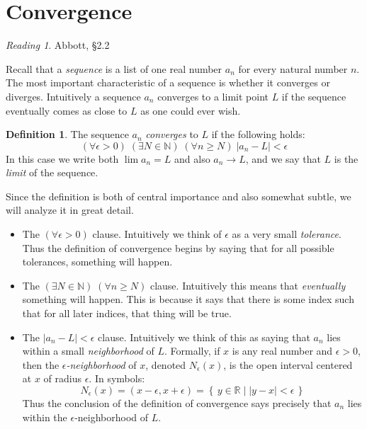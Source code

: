 \documentclass[11pt,oneside]{amsbook}
\newcommand{\set}[1]{\left\{\,#1\,\right\}}
\newcommand{\N}{\mathbb N}
\newcommand{\R}{\mathbb R}
\theoremstyle{definition}
\theoremstyle{plain}
\theoremstyle{definition}
\newtheorem{definition}[theorem]{Definition}
\theoremstyle{remark}
\newtheorem*{reading}{Reading}
\numberwithin{equation}{section}
\numberwithin{figure}{section}
\begin{document}
\newpage
\section{Convergence}

\begin{reading}
  Abbott, \S 2.2
\end{reading}

Recall that a \emph{sequence} is a list of one real number $a_n$ for every natural number $n$. The most important characteristic of a sequence is whether it converges or diverges. Intuitively a sequence $a_n$ converges to a limit point $L$ if the sequence eventually comes as close to $L$ as one could ever wish.

\begin{definition}
  The sequence $a_n$ \emph{converges} to $L$ if the following holds:
  \[(\forall\epsilon>0)\;(\exists N\in\N)\;(\forall n\geq N)\;|a_n-L|<\epsilon
  \]
  In this case we write both $\lim a_n=L$ and also $a_n\to L$, and we say that $L$ is the \emph{limit} of the sequence.
\end{definition}

Since the definition is both of central importance and also somewhat subtle, we will analyze it in great detail.

\begin{itemize}
\item The $(\forall\epsilon>0)$ clause. Intuitively we think of $\epsilon$ as a very small \emph{tolerance}. Thus the definition of convergence begins by saying that for all possible tolerances, something will happen.
\item The $(\exists N\in\N)\;(\forall n\geq N)$ clause. Intuitively this means that \emph{eventually} something will happen. This is because it says that there is some index such that for all later indices, that thing will be true.
\item The $|a_n-L|<\epsilon$ clause. Intuitively we think of this as saying that $a_n$ lies within a small \emph{neighborhood} of $L$. Formally, if $x$ is any real number and $\epsilon>0$, then the \emph{$\epsilon$-neighborhood} of $x$, denoted $N_\epsilon(x)$, is the open interval centered at $x$ of radius $\epsilon$. In symbols:
  \[N_\epsilon(x)=(x-\epsilon,x+\epsilon)=\set{y\in\R\mid|y-x|<\epsilon}
  \]
  Thus the conclusion of the definition of convergence says precisely that $a_n$ lies within the $\epsilon$-neighborhood of $L$.
\end{itemize}
\end{document}
